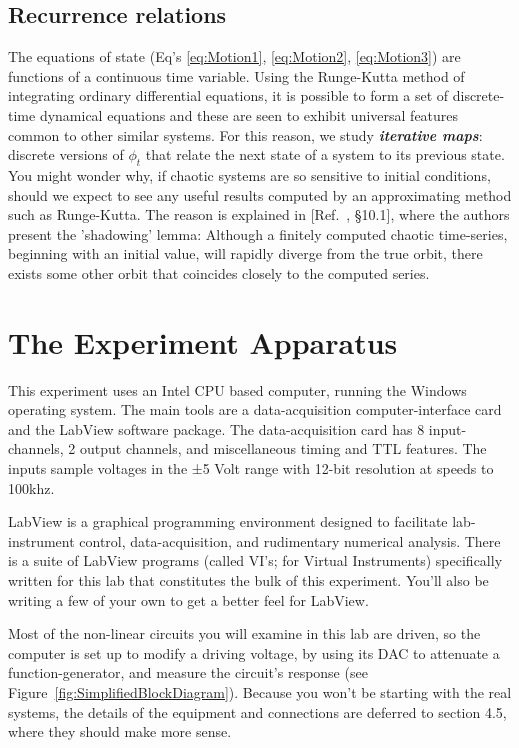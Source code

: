 \documentclass{../lab}
\begin{document}
\subsection{Recurrence relations}

\newpage

The equations of state (Eq's \eqref{eq:Motion1}, \eqref{eq:Motion2}, 
\eqref{eq:Motion3}) are functions of a continuous time variable. Using the Runge-Kutta method of integrating ordinary differential equations, it is possible to form a set of discrete-time dynamical equations and these are seen to exhibit universal features common to other similar systems. For this reason, we study \emph{\textbf{iterative maps}}: discrete versions of $ \phi_t $ that relate the next state of a system to its previous state. You might wonder why, if chaotic systems are so sensitive to initial conditions, should we expect to see any useful results computed by an approximating method such as Runge-Kutta. The reason is explained in [Ref.~\cite{Strogatz}, \S10.1], where the authors present the 'shadowing' lemma: Although a finitely computed chaotic time-series, beginning with an initial value, will rapidly diverge from the true orbit, there exists some other orbit that coincides closely to the computed series.

\section{The Experiment Apparatus}

This experiment uses an Intel CPU based computer, running the Windows operating system. The main tools are a data-acquisition computer-interface card and the LabView software package. The data-acquisition card has 8 input-channels, 2 output channels, and miscellaneous timing and TTL features. The inputs sample voltages in the ±5 Volt range with 12-bit resolution at speeds to 100khz.

LabView is a graphical programming environment designed to facilitate lab-instrument control, data-acquisition, and rudimentary numerical analysis. There is a suite of LabView programs (called VI's; for Virtual Instruments) specifically written for this lab that constitutes the bulk of this experiment. You'll also be writing a few of your own to get a better feel for LabView.

Most of the non-linear circuits you will examine in this lab are driven, so the computer is set up to modify a driving voltage, by using its DAC to attenuate a function-generator, and measure the circuit's response (see Figure~\ref{fig:SimplifiedBlockDiagram}). Because you won't be starting with the real systems, the details of the equipment and connections are deferred to section 4.5, where they should make more sense.
\end{document}
